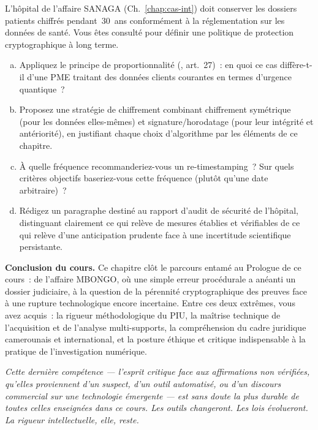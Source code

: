 \begin{boxexo}[title={\ding{45}\quad Exercice~25.3 --- Politique d'archivage à long terme \niveauexpert}]
L'hôpital de l'affaire SANAGA (Ch.~\ref{chap:cas-int}) doit conserver
les dossiers patients chiffrés pendant~30~ans conformément à la
réglementation sur les données de santé. Vous êtes consulté pour
définir une politique de protection cryptographique à long terme.
\begin{enumerate}[(a)]
    \item Appliquez le principe de proportionnalité
          (, art.~27)~: en quoi ce cas diffère-t-il
          d'une PME traitant des données clients courantes en
          termes d'urgence quantique~?
    \item Proposez une stratégie de chiffrement combinant
          chiffrement symétrique (pour les données elles-mêmes)
          et signature/horodatage (pour leur intégrité et
          antériorité), en justifiant chaque choix d'algorithme
          par les éléments de ce chapitre.
    \item À quelle fréquence recommanderiez-vous un re-timestamping~?
          Sur quels critères objectifs baseriez-vous cette
          fréquence (plutôt qu'une date arbitraire)~?
    \item Rédigez un paragraphe destiné au rapport d'audit de
          sécurité de l'hôpital, distinguant clairement ce qui
          relève de mesures établies et vérifiables de ce qui
          relève d'une anticipation prudente face à une incertitude
          scientifique persistante.
\end{enumerate}
\end{boxexo}

\bigskip

\begin{boxinfo}
\textbf{Conclusion du cours.} Ce chapitre clôt le parcours entamé
au Prologue de ce cours~: de l'affaire MBONGO, où une simple erreur
procédurale a anéanti un dossier judiciaire, à la question de la
pérennité cryptographique des preuves face à une rupture
technologique encore incertaine. Entre ces deux extrêmes, vous
avez acquis~: la rigueur méthodologique du PIU, la maîtrise
technique de l'acquisition et de l'analyse multi-supports, la
compréhension du cadre juridique camerounais et international,
et la posture éthique et critique indispensable à la pratique
de l'investigation numérique.

\textit{Cette dernière compétence --- l'esprit critique face aux
affirmations non vérifiées, qu'elles proviennent d'un suspect,
d'un outil automatisé, ou d'un discours commercial sur une
technologie émergente --- est sans doute la plus durable de
toutes celles enseignées dans ce cours. Les outils changeront.
Les lois évolueront. La rigueur intellectuelle, elle, reste.}
\end{boxinfo}